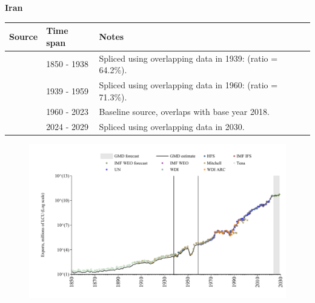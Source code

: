 \documentclass[12pt,a4paper,landscape]{article}
\begin{document}
\begin{adjustbox}{max totalsize={\paperwidth}{\paperheight},center}
\begin{minipage}[t][\textheight][t]{\textwidth}
\vspace*{0.5cm}
{}
\begin{center}
{\Large\bfseries Iran}
\end{center}
\vspace{0.5cm}
\begin{table}[H]
\centering
\small
\begin{tabular}{|l|l|l|}
\hline
\textbf{Source} & \textbf{Time span} & \textbf{Notes} \\
\hline
\rowcolor{white}\cite{Tena}& 1850 - 1938 &Spliced using overlapping data in 1939: (ratio = 64.2\%).\\
\rowcolor{lightgray}\cite{Mitchell}& 1939 - 1959 &Spliced using overlapping data in 1960: (ratio = 71.3\%).\\
\rowcolor{white}\cite{WDI}& 1960 - 2023 &Baseline source, overlaps with base year 2018.\\
\rowcolor{lightgray}\cite{IMF_WEO_forecast}& 2024 - 2029 &Spliced using overlapping data in 2030.\\
\hline
\end{tabular}
\end{table}
\begin{figure}[H]
\centering
\includegraphics[width=\textwidth,height=0.6\textheight,keepaspectratio]{graphs/IRN_exports.pdf}
\end{figure}
\end{minipage}
\end{adjustbox}
\end{document}
